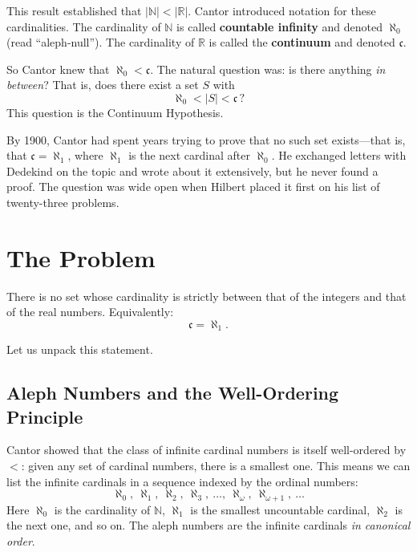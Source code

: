 This result established that $|\mathbb{N}| < |\mathbb{R}|$. Cantor introduced notation for these cardinalities. The cardinality of $\mathbb{N}$ is called \textbf{countable infinity} and denoted $\aleph_0$ (read ``aleph-null''). The cardinality of $\mathbb{R}$ is called the \textbf{continuum} and denoted $\mathfrak{c}$.

So Cantor knew that $\aleph_0 < \mathfrak{c}$. The natural question was: is there anything \emph{in between}? That is, does there exist a set $S$ with
\[
    \aleph_0 < |S| < \mathfrak{c} \, ?
\]
This question is the Continuum Hypothesis.

By 1900, Cantor had spent years trying to prove that no such set exists---that is, that $\mathfrak{c} = \aleph_1$, where $\aleph_1$ is the next cardinal after $\aleph_0$. He exchanged letters with Dedekind on the topic and wrote about it extensively, but he never found a proof. The question was wide open when Hilbert placed it first on his list of twenty-three problems.

\section{The Problem}

\begin{problem_statement}
There is no set whose cardinality is strictly between that of the integers and that of the real numbers. Equivalently:
\[
    \mathfrak{c} = \aleph_1.
\]
\end{problem_statement}

Let us unpack this statement.

\subsection{Aleph Numbers and the Well-Ordering Principle}

Cantor showed that the class of infinite cardinal numbers is itself well-ordered by $<$: given any set of cardinal numbers, there is a smallest one. This means we can list the infinite cardinals in a sequence indexed by the ordinal numbers:
\[
    \aleph_0,\ \aleph_1,\ \aleph_2,\ \aleph_3,\ \ldots,\ \aleph_\omega,\ \aleph_{\omega+1},\ \ldots
\]
Here $\aleph_0$ is the cardinality of $\mathbb{N}$, $\aleph_1$ is the smallest uncountable cardinal, $\aleph_2$ is the next one, and so on. The aleph numbers are the infinite cardinals \emph{in canonical order}.

